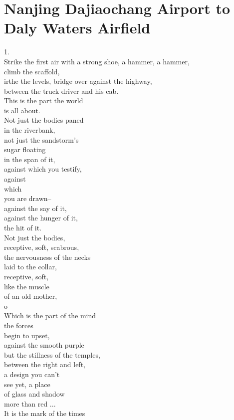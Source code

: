 \documentclass[smalldemyvopaper,11pt,twoside,onecolumn,openright,extrafontsizes]{memoir}
\begin{document}
\chapter{Nanjing Dajiaochang Airport to Daly Waters Airfield}
1.
\\Strike the first air with a strong shoe, a hammer, a hammer,
\\climb the scaffold,
\\irthe the levels, bridge over against the highway,
\\between the truck driver and his cab.
\\This is the part the world
\\is all about.
\\Not just the bodies paned
\\in the riverbank,
\\not just the sandstorm's
\\sugar floating
\\in the span of it,
\\against which you testify,
\\against
\\which
\\you are drawn--
\\against the say of it,
\\against the hunger of it,
\\the hit of it.
\\Not just the bodies,
\\receptive, soft, scabrous,
\\the nervousness of the necks
\\laid to the collar,
\\receptive, soft,
\\like the muscle
\\of an old mother,
\\o
\\Which is the part of the mind
\\the forces
\\begin to upset,
\\against the smooth purple
\\but the stillness of the temples,
\\between the right and left,
\\a design you can't
\\see yet, a place
\\of glass and shadow
\\more than red ...
\\It is the mark of the times
\end{document}
